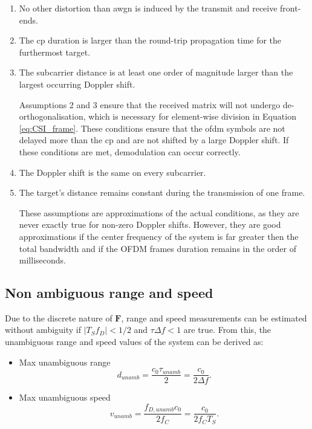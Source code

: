     \begin{enumerate}
    	\item No other distortion than \gls{awgn} is induced by the transmit and receive front-ends.
    	\item The \gls{cp} duration is larger than the round-trip propagation time for the furthermost target.
    	\item The subcarrier distance is at least one order of magnitude larger than the largest occurring Doppler shift.
    	
		Assumptions 2 and 3 ensure that the received matrix will not undergo de-orthogonalisation, which is necessary for element-wise division in Equation \eqref{eq:CSI_frame}. These conditions ensure that the \gls{ofdm} symbols are not delayed more than the \gls{cp} and are not shifted by a large Doppler shift. If these conditions are met, demodulation can occur correctly.
    	
    	\item The Doppler shift is the same on every subcarrier.
    	\item The target’s distance remains constant during the transmission of one frame.
    	
    	These assumptions are approximations of the actual conditions, as they are never exactly true for non-zero Doppler shifts. However, they are good approximations if the center frequency of the system is far greater then the total bandwidth and if the OFDM frames duration remains in the order of milliseconds.
    \end{enumerate}
    
    \subsection{Non ambiguous range and speed}
    
        Due to the discrete nature of $\mathbf{F}$, range and speed measurements can be estimated without ambiguity if $|T_S f_D| < 1/2$ and $\tau \Delta f < 1$ are true.
        From this, the unambiguous range and speed values of the system can be derived as:
        
        \begin{itemize}
            \item Max unambiguous range
            $$ d_{unamb} = \frac{c_0 \tau_{unamb}}{2} = \frac{c_0}{2\Delta f}.$$
            \item Max unambiguous speed
            $$ v_{unamb} = \frac{f_{D,unamb} c_0}{2f_C} = \frac{c_0}{2f_C T_S}.$$
        \end{itemize}
        
